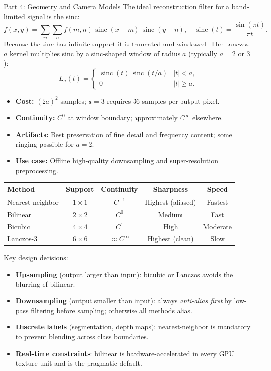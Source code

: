 \documentclass[letterpaper]{article}
\begin{document}
\begin{notes}{Part 4: Geometry and Camera Models}
The ideal reconstruction filter for a band-limited signal is the sinc:
$$f(x,y) = \sum_{m}\sum_{n} f(m,n)\,\operatorname{sinc}(x-m)\,\operatorname{sinc}(y-n), \quad \operatorname{sinc}(t) = \frac{\sin(\pi t)}{\pi t}.$$
Because the sinc has infinite support it is truncated and windowed. The Lanczos-$a$ kernel multiplies sinc by a sinc-shaped window of radius $a$ (typically $a=2$ or $3$):
$$L_a(t) = \begin{cases} \operatorname{sinc}(t)\,\operatorname{sinc}(t/a) & |t| < a, \\ 0 & |t| \ge a. \end{cases}$$
\begin{itemize}
    \item \textbf{Cost:} $(2a)^2$ samples; $a=3$ requires 36 samples per output pixel.
    \item \textbf{Continuity:} $C^0$ at window boundary; approximately $C^\infty$ elsewhere.
    \item \textbf{Artifacts:} Best preservation of fine detail and frequency content; some ringing possible for $a=2$.
    \item \textbf{Use case:} Offline high-quality downsampling and super-resolution preprocessing.
\end{itemize}


\begin{center}
\begin{tabular}{lcccc}
\hline
\textbf{Method} & \textbf{Support} & \textbf{Continuity} & \textbf{Sharpness} & \textbf{Speed} \\
\hline
Nearest-neighbor & $1\times1$ & $C^{-1}$ & Highest (aliased) & Fastest \\
Bilinear         & $2\times2$ & $C^0$    & Medium             & Fast \\
Bicubic          & $4\times4$ & $C^1$    & High               & Moderate \\
Lanczos-3        & $6\times6$ & $\approx C^\infty$ & Highest (clean) & Slow \\
\hline
\end{tabular}
\end{center}

Key design decisions:
\begin{itemize}
    \item \textbf{Upsampling} (output larger than input): bicubic or Lanczos avoids the blurring of bilinear.
    \item \textbf{Downsampling} (output smaller than input): always \emph{anti-alias first} by low-pass filtering before sampling; otherwise all methods alias.
    \item \textbf{Discrete labels} (segmentation, depth maps): nearest-neighbor is mandatory to prevent blending across class boundaries.
    \item \textbf{Real-time constraints}: bilinear is hardware-accelerated in every GPU texture unit and is the pragmatic default.
\end{itemize}



\end{notes}
\end{document}
